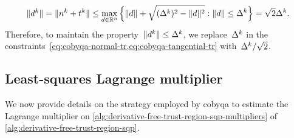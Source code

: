 \begin{equation*}
    \norm{\step[k]} = \norm{\nstep[k] + \tstep[k]} \le \max_{d \in \R^n} \set[\Big]{\norm{d} + \sqrt{(\rad[k])^2 - \norm{\step}^2} : \norm{d} \le \rad[k]} = \sqrt{2} \rad[k].
\end{equation*}
Therefore, to maintain the property~$\norm{\step[k]} \le \rad[k]$, we replace~$\rad[k]$ in the constraints~\cref{eq:cobyqa-normal-tr,eq:cobyqa-tangential-tr} with~$\rad[k] / \sqrt{2}$.


\subsection{Least-squares Lagrange multiplier}
\label{subsec:least-squares-lagrange-multipliers}

We now provide details on the strategy employed by \gls{cobyqa} to estimate the Lagrange multiplier on \cref{alg:derivative-free-trust-region-sqp-multipliers} of \cref{alg:derivative-free-trust-region-sqp}.

